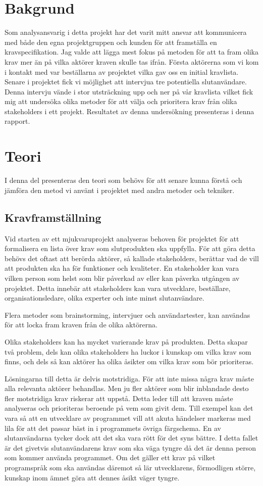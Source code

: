 \section{Bakgrund}
Som analysansvarig i detta projekt har det varit mitt ansvar att kommunicera med både den egna projektgruppen och kunden för att framställa en kravspecifikation. Jag valde att lägga mest fokus på metoden för att ta fram olika krav mer än på vilka aktörer kraven skulle tas ifrån. Första aktörerna som vi kom i kontakt med var beställarna av projektet vilka gav oss en initial kravlista. Senare i projektet fick vi möjlighet att intervjua tre potentiella slutanvändare. Denna intervju vände i stor utsträckning upp och ner på vår kravlista vilket fick mig att undersöka olika metoder för att välja och prioritera krav från olika stakeholders i ett projekt. Resultatet av denna undersökning presenteras i denna rapport.

\section{Teori}
I denna del presenteras den teori som behövs för att senare kunna förstå och jämföra den metod vi använt i projektet med andra metoder och tekniker.

\subsection{Kravframställning}
Vid starten av ett mjukvaruprojekt analyseras behoven för projektet för att formalisera en lista över krav som slutprodukten ska uppfylla. För att göra detta behövs det oftast att berörda aktörer, så kallade stakeholders, berättar vad de vill att produkten ska ha för funktioner och kvaliteter. En stakeholder kan vara vilken person som helst som blir påverkad av eller kan påverka utgången av projektet. Detta innebär att stakeholders kan vara  utvecklare, beställare, organisationsledare, olika experter och inte minst slutanvändare.

Flera metoder som brainstorming, intervjuer och användartester, kan användas för att locka fram kraven från de olika aktörerna.

Olika stakeholders kan ha mycket varierande krav på produkten. Detta skapar två problem, dels kan olika stakeholders ha luckor i kunskap om vilka krav som finns, och dels så kan aktörer ha olika åsikter om vilka krav som bör prioriteras.

Lösningarna till detta är delvis motstridiga. För att inte missa några krav måste alla relevanta aktörer behandlas. Men ju fler aktörer som blir inblandade desto fler motstridiga krav riskerar att uppstå. Detta leder till att kraven måste analyseras och prioriteras beroende på vem som givit dem.
Till exempel kan det vara så att en utvecklare av programmet vill att akuta händelser markeras med lila för att det passar bäst in i programmets övriga färgschema. En av slutanvändarna tycker dock att det ska vara rött för det syns bättre. I detta fallet är det givetvis slutanvändarens krav som ska väga tyngre då det är denna person som kommer använda programmet.
Om det gäller ett krav på vilket programspråk som ska användas däremot så lär utvecklarens, förmodligen större, kunskap inom ämnet göra att dennes åsikt väger tyngre.


